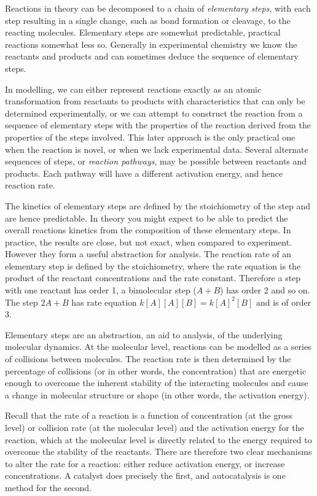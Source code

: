 Reactions in theory can be decomposed to a chain of
\emph{elementary steps}, with each step resulting in a single change,
such as bond formation or cleavage, to the reacting molecules.
Elementary steps are somewhat predictable, practical reactions somewhat
less so. Generally in experimental chemistry we know the reactants and
products and can sometimes deduce the sequence of elementary steps.

In modelling, we can either represent reactions exactly as an atomic
transformation from reactants to products with characteristics that can
only be determined experimentally, or we can attempt to construct the
reaction from a sequence of elementary steps with the properties of the
reaction derived from the properties of the steps involved. This later
approach is the only practical one when the reaction is novel, or when
we lack experimental data. Several alternate sequences of steps, or
\textit{reaction pathways}, may be possible between reactants and
products. Each pathway will have a different activation energy, and
hence reaction rate.

The kinetics of elementary steps are defined by the stoichiometry of the
step and are hence predictable. In theory you might expect to be able to
predict the overall reactions kinetics from the composition of these
elementary steps. In practice, the results are close, but not exact,
when compared to experiment. However they form a useful abstraction for
analysis. The reaction rate of an elementary step is defined by the
stoichiometry, where the rate equation is the product of the reactant
concentrations and the rate constant. Therefore a step with one reactant
has order 1, a bimolecular step (\(A + B\)) has order 2 and so on. The
step \(2A + B\) has rate equation \(k[A][A][B] = k[A]^2[B]\) and is of
order 3.

Elementary steps are an abstraction, an aid to analysis, of the
underlying molecular dynamics. At the molecular level, reactions can be
modelled as a series of collisions between molecules. The reaction rate
is then determined by the percentage of collisions (or in other words,
the concentration) that are energetic enough to overcome the inherent
stability of the interacting molecules and cause a change in molecular
structure or shape (in other words, the activation energy).

Recall that the rate of a reaction is a function of concentration (at
the gross level) or collision rate (at the molecular level) and the
activation energy for the reaction, which at the molecular level is
directly related to the energy required to overcome the stability of the
reactants. There are therefore two clear mechanisms to alter the rate
for a reaction: either reduce activation energy, or increase
concentrations. A catalyst does precisely the first, and autocatalysis
is one method for the second.

